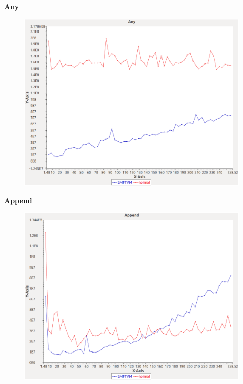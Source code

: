 \noindent\textbf{Any}

\begin{figure}[h]
\centering
\includegraphics[width=\textwidth]{graphs/orderedset/Any}
\end{figure}
\pagebreak

\noindent\textbf{Append}

\begin{figure}[h]
\centering
\includegraphics[width=\textwidth]{graphs/orderedset/Append}
\end{figure}
\pagebreak

